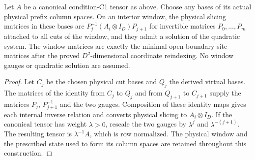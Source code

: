 \begin{lemma}
    \label{lem:quadratic_actual_physical_window_solution}
    \leanok
    Let $A$ be a canonical condition-C1 tensor as above. Choose any
    bases of its actual physical prefix column spaces. On an interior
    window, the physical slicing matrices in these bases are
    $P_j^{-1}(A_i\otimes I_D)P_{j+1}$ for invertible matrices
    $P_0,\ldots,P_m$ attached to all cuts of the window, and they admit a
    solution of the quadratic system. The window matrices are exactly
    the minimal open-boundary site matrices after the proved
    $D^2$-dimensional coordinate reindexing. No window gauges or
    quadratic solution are assumed.
\end{lemma}
\begin{proof}
    \leanok
    Let $C_j$ be the chosen physical cut bases and $Q_j$ the derived
    virtual bases. The matrices of the identity from $C_j$ to $Q_j$
    and from $Q_{j+1}$ to $C_{j+1}$ supply the matrices $P_j$, $P_{j+1}^{-1}$
    and the two gauges. Composition
    of these identity maps gives each internal inverse relation and
    converts physical slicing to $A_i\otimes I_D$. If the canonical
    tensor has weight $\lambda>0$, rescale the two gauges by
    $\lambda^j$ and $\lambda^{-(j+1)}$. The resulting tensor is
    $\lambda^{-1}A$, which is row normalized. The physical window
    and the prescribed state used to form its column spaces are
    retained throughout this construction.
\end{proof}
